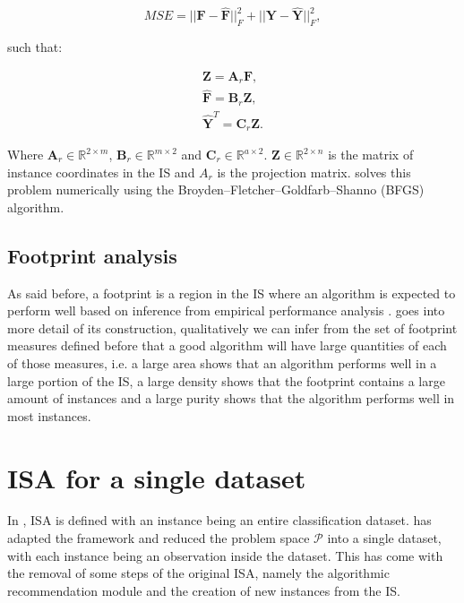 \begin{equation}
	MSE = ||\mathbf{F} - \mathbf{\hat{F}}||_F^2 + ||\mathbf{Y} - \mathbf{\hat{Y}}||_F^2,
\end{equation}

such that:

\begin{gather}
	\mathbf{Z} = \mathbf{A}_r \mathbf{F} \label{eq:z_is}, \\
	\mathbf{\hat{F}} = \mathbf{B}_r \mathbf{Z} \label{eq:f_hat}, \\
	\mathbf{\hat{Y}}^T = \mathbf{C}_r \mathbf{Z} \label{eq:y_hat}.
\end{gather}

Where $\mathbf{A}_r \in \mathbb{R}^{2 \times m}$, $\mathbf{B}_r \in \mathbb{R}^{m \times 2}$ and $\mathbf{C}_r \in \mathbb{R}^{a \times 2}$. $\mathbf{Z} \in \mathbb{R}^{2 \times n}$ is the matrix of instance coordinates in the IS and $A_r$ is the projection matrix. \cite{SmithMiles2023} solves this problem numerically using the Broyden–Fletcher–Goldfarb–Shanno (BFGS) algorithm.

\subsection{Footprint analysis}

As said before, a footprint is a region in the IS where an algorithm is expected to perform well based on inference from empirical performance analysis \cite{Munoz2018}.  goes into more detail of its construction, qualitatively we can infer from the set of footprint measures defined before that a good algorithm will have large quantities of each of those measures, i.e. a large area shows that an algorithm performs well in a large portion of the IS, a large density shows that the footprint contains a large amount of instances and a large purity shows that the algorithm performs well in most instances.

\section{ISA for a single dataset}

In , ISA is defined with an instance being an entire classification dataset.  has adapted the framework and reduced the problem space $\mathcal{P}$ into a single dataset, with each instance being an observation inside the dataset. This has come with the removal of some steps of the original ISA, namely the algorithmic recommendation module and the creation of new instances from the IS.


